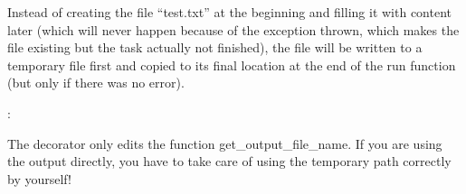 \documentclass[letterpaper,10pt,english]{sphinxmanual}
\begin{document}
\begin{fulllineitems}
Instead of creating the file “test.txt” at the beginning and filling it with content
later (which will never happen because of the exception thrown, which makes the file
existing but the task actually not finished), the file will be written to a temporary
file first and copied to its final location at the end of the run function (but only if there
was no error).

:

The decorator only edits the function get\_output\_file\_name. If you are using
the output directly, you have to take care of using the temporary path correctly by yourself!

\end{fulllineitems}

\end{document}
